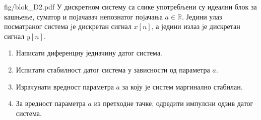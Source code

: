 \begin{slikaDesno}{fig/blok_D2.pdf}
    \PID У дискретном систему са слике употребљени су идеални блок за кашњење,
    суматор и поjачавач непознатог поjачања $a \in \mathbb R$. 
    Једини улаз посматраног
    система jе дискретан сигнал $x[n]$, а једини излаз jе дискретан сигнал $y[n]$.
\end{slikaDesno}
\begin{enumerate}[label=(\alph*)]
    \item Написати диференцну једначину датог система.
    \item Испитати  стабилност датог система у зависности од параметра $a$.
    \item Израчунати вредност параметра $a$ за коју jе систем маргинално стабилан.
    \item За вредност параметра $a$ из претходне тачке, одредити импулсни одзив
    датог система.
\end{enumerate}

